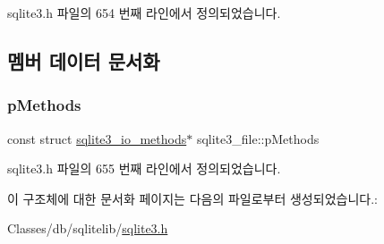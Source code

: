 sqlite3.\+h 파일의 654 번째 라인에서 정의되었습니다.



\subsection{멤버 데이터 문서화}
\mbox{\label{structsqlite3__file_adfc58b2d7514112375d7330e2881bc70}} 
\subsubsection{\texorpdfstring{p\+Methods}{pMethods}}
{\footnotesize\ttfamily const struct \hyperlink{structsqlite3__io__methods}{sqlite3\+\_\+io\+\_\+methods}$\ast$ sqlite3\+\_\+file\+::p\+Methods}



sqlite3.\+h 파일의 655 번째 라인에서 정의되었습니다.



이 구조체에 대한 문서화 페이지는 다음의 파일로부터 생성되었습니다.\+:\begin{DoxyCompactItemize}
\item 
Classes/db/sqlitelib/\hyperlink{sqlite3_8h}{sqlite3.\+h}\end{DoxyCompactItemize}
